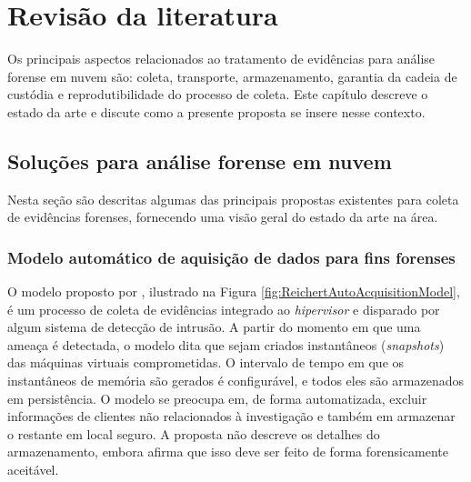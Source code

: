 \chapter{Revisão da literatura}
\label{chp:revisão}

Os principais aspectos relacionados ao tratamento de evidências para análise forense em nuvem são: coleta, transporte, armazenamento, garantia da cadeia de custódia e reprodutibilidade do processo de coleta. 
%
Este capítulo descreve o estado da arte e discute como a presente proposta se insere nesse contexto.


\section{Soluções para análise forense em nuvem}
\label{sec:estadodaarte}


Nesta seção são descritas algumas das principais propostas existentes para coleta de evidências forenses, fornecendo uma visão geral do estado da arte na área.

\subsection{Modelo automático de aquisição de dados para fins forenses}
\label{sec:aquisicaoautomatica}


O modelo proposto por \cite{ReichertAutoAcquisition:2015}, ilustrado na Figura \ref{fig:ReichertAutoAcquisitionModel}, é um processo de coleta de evidências integrado ao \textit{hipervisor} e disparado por algum sistema de detecção de intrusão. 
%
A partir do momento em que uma ameaça é detectada, o modelo dita que sejam criados instantâneos (\textit{snapshots}) das máquinas virtuais comprometidas. 
%
O intervalo de tempo em que os instantâneos de memória são gerados é configurável, e todos eles são armazenados em persistência.
%
O modelo se preocupa em, de forma automatizada, excluir informações de clientes não relacionados à investigação e também em armazenar o restante em local seguro.
%
A proposta não descreve os detalhes do armazenamento, embora afirma que isso deve ser feito de forma forensicamente aceitável.


